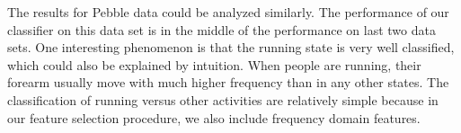 The results for Pebble data could be analyzed similarly. The performance of our classifier on this data set is in the middle of the performance on last two data sets. One interesting phenomenon is that the running state is very well classified, which could also be explained by intuition. When people are running, their forearm usually move with much higher frequency than in any other states. The classification of running versus other activities are relatively simple because in our feature selection procedure, we also include frequency domain features. 

